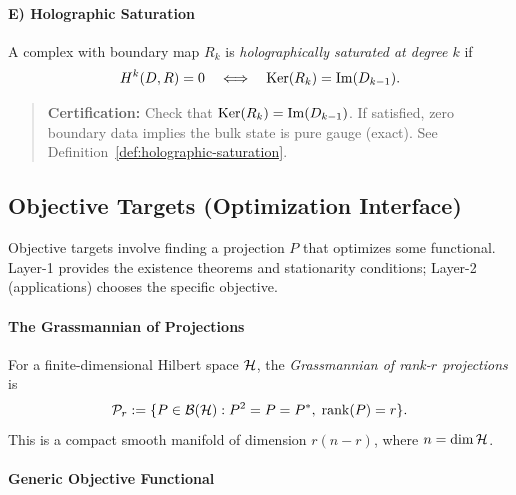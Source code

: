 \paragraph{E) Holographic Saturation}

\begin{definition}
\label{def:holographic-saturation-targets}
A complex with boundary map $R_k$ is \emph{holographically saturated at degree $k$} if
\[
H^{k}(D,R) = 0 \quad \Longleftrightarrow \quad \mathrm{Ker}(R_k) = \mathrm{Im}(D_{k-1}).
\]
\end{definition}

\begin{quote}\small
\textbf{Certification:} Check that $\mathrm{Ker}(R_k) = \mathrm{Im}(D_{k-1})$.
If satisfied, zero boundary data implies the bulk state is pure gauge (exact).
See Definition~\ref{def:holographic-saturation}.
\end{quote}

\subsection{Objective Targets (Optimization Interface)}
\label{subsec:objective-targets}

Objective targets involve finding a projection $P$ that optimizes some functional.
Layer-1 provides the existence theorems and stationarity conditions; Layer-2 (applications) chooses the specific objective.

\paragraph{The Grassmannian of Projections}

\begin{definition}[Grassmannian]
\label{def:grassmannian}
For a finite-dimensional Hilbert space $\mathcal{H}$, the \emph{Grassmannian of rank-$r$ projections} is
\[
\mathcal{P}_{r} := \{ P \in \mathcal{B}(\mathcal{H}) : P^2 = P = P^*, \; \mathrm{rank}(P) = r \}.
\]
This is a compact smooth manifold of dimension $r(n - r)$, where $n = \dim \mathcal{H}$.
\end{definition}

\paragraph{Generic Objective Functional}

